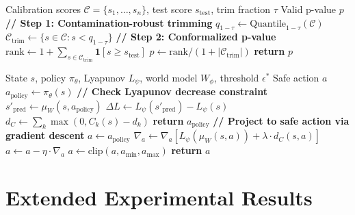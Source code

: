 \documentclass{article}
\newcommand{\RETURN}{\STATE \textbf{return} }
\theoremstyle{plain}
\theoremstyle{definition}
\theoremstyle{remark}
\begin{document}
\begin{algorithm}[H]
\caption{Conformalized P-Value Construction}
\label{alg:pvalue}
\begin{algorithmic}[1]
\REQUIRE Calibration scores $\mathcal{C} = \{s_1, \ldots, s_n\}$, test score $s_{\text{test}}$, trim fraction $\tau$
\ENSURE Valid p-value $p$
\STATE \textbf{// Step 1: Contamination-robust trimming}
\STATE $q_{1-\tau} \leftarrow \text{Quantile}_{1-\tau}(\mathcal{C})$
\STATE $\mathcal{C}_{\text{trim}} \leftarrow \{s \in \mathcal{C} : s < q_{1-\tau}\}$
\STATE \textbf{// Step 2: Conformalized p-value}
\STATE $\text{rank} \leftarrow 1 + \sum_{s \in \mathcal{C}_{\text{trim}}} \mathbf{1}[s \geq s_{\text{test}}]$
\STATE $p \leftarrow \text{rank} / (1 + |\mathcal{C}_{\text{trim}}|)$
\RETURN $p$
\end{algorithmic}
\end{algorithm}

\begin{algorithm}[H]
\caption{Lyapunov-Safe Action Selection}
\label{alg:lyapunov}
\begin{algorithmic}[1]
\REQUIRE State $s$, policy $\pi_\theta$, Lyapunov $L_\psi$, world model $W_\phi$, threshold $\epsilon^*$
\ENSURE Safe action $a$
\STATE $a_{\text{policy}} \leftarrow \pi_\theta(s)$
\STATE \textbf{// Check Lyapunov decrease constraint}
\STATE $s'_{\text{pred}} \leftarrow \mu_W(s, a_{\text{policy}})$
\STATE $\Delta L \leftarrow L_\psi(s'_{\text{pred}}) - L_\psi(s)$
\STATE $d_C \leftarrow \sum_k \max(0, C_k(s) - d_k)$
    \RETURN $a_{\text{policy}}$ 
\ELSE
    \STATE \textbf{// Project to safe action via gradient descent}
    \STATE $a \leftarrow a_{\text{policy}}$
        \STATE $\nabla_a \leftarrow \nabla_a [L_\psi(\mu_W(s, a)) + \lambda \cdot d_C(s, a)]$
        \STATE $a \leftarrow a - \eta \cdot \nabla_a$
        \STATE $a \leftarrow \text{clip}(a, a_{\min}, a_{\max})$
    \ENDFOR
    \RETURN $a$
\ENDIF
\end{algorithmic}
\end{algorithm}

\section{Extended Experimental Results}
\label{app:extended_results}
\label{app:ablation}
\end{document}
